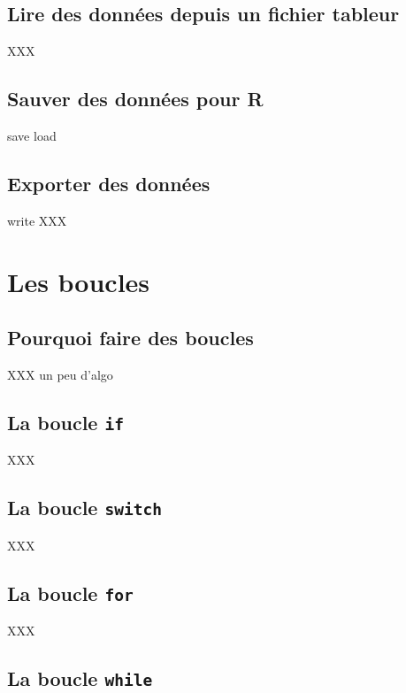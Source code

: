 \documentclass[]{book}
\begin{document}
\section{Lire des données depuis un fichier
tableur}\label{lire-des-donnees-depuis-un-fichier-tableur}

XXX

\section{Sauver des données pour R}\label{sauver-des-donnees-pour-r}

save load

\section{Exporter des données}\label{exporter-des-donnees}

write XXX

\chapter{Les boucles}\label{loops}

\section{Pourquoi faire des boucles}\label{pourquoi-faire-des-boucles}

XXX un peu d'algo

\section{\texorpdfstring{La boucle
\texttt{if}}{La boucle if}}\label{la-boucle-if}

XXX

\section{\texorpdfstring{La boucle
\texttt{switch}}{La boucle switch}}\label{la-boucle-switch}

XXX

\section{\texorpdfstring{La boucle
\texttt{for}}{La boucle for}}\label{la-boucle-for}

XXX

\section{\texorpdfstring{La boucle
\texttt{while}}{La boucle while}}\label{la-boucle-while}
\end{document}
